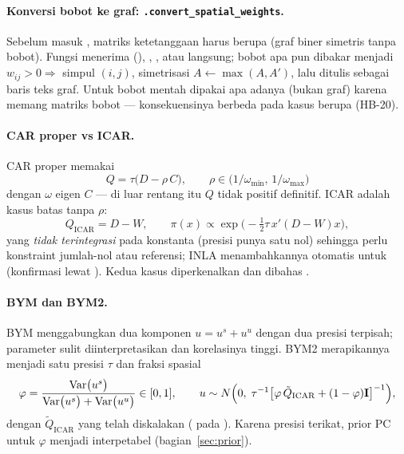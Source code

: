 \paragraph{Konversi bobot ke graf: \texttt{.convert\_spatial\_weights}.}
\label{sec:bayes-w}
Sebelum masuk , matriks ketetanggaan harus berupa
 (graf biner simetris tanpa bobot). Fungsi
 menerima  (),
, , atau  langsung; bobot apa pun
dibakar menjadi $w_{ij}>0\Rightarrow$ simpul $(i,j)$, simetrisasi
$A\leftarrow\max(A,A')$, lalu ditulis sebagai baris teks graf. Untuk
 bobot mentah dipakai apa adanya (bukan graf) karena
 memang matriks bobot --- konsekuensinya berbeda pada
kasus  berupa  (HB-20).

\paragraph{CAR proper vs ICAR.} CAR proper memakai
\begin{equation}
  Q=\tau\bigl(D-\rho\,C\bigr),\qquad
  \rho\in\bigl(1/\omega_{\min},\,1/\omega_{\max}\bigr)
  \label{eq:car-proper}
\end{equation}
dengan $\omega$ eigen $C$ --- di luar rentang itu $Q$ tidak positif
definitif. ICAR adalah kasus batas tanpa $\rho$:
\begin{equation}
  Q_{\text{ICAR}}=D-W,\qquad
  \pi(x)\propto\exp\bigl(-\tfrac12\tau\,x'(D-W)x\bigr),
  \label{eq:icar}
\end{equation}
yang \emph{tidak terintegrasi} pada konstanta (presisi punya satu nol) sehingga
perlu konstraint jumlah-nol atau referensi; INLA menambahkannya otomatis
untuk  (konfirmasi lewat ).
Kedua kasus diperkenalkan \citet{besag1974spatial} dan dibahas
\citet{banerjee2014hierarchical}.

\paragraph{BYM dan BYM2.}\label{sec:bym2} BYM \citep{besag1991bayesian} menggabungkan dua
komponen $u=u^{s}+u^{u}$ dengan dua presisi terpisah; parameter sulit
diinterpretasikan dan korelasinya tinggi. BYM2 \citep{riebler2016intuitive}
merapikannya menjadi satu presisi $\tau$ dan fraksi spasial
\begin{equation}
  \varphi=\frac{\operatorname{Var}\bigl(u^{s}\bigr)}
  {\operatorname{Var}\bigl(u^{s}\bigr)+\operatorname{Var}\bigl(u^{u}\bigr)}\in[0,1],
  \qquad
  u\sim N\Bigl(0,\;\tau^{-1}\bigl[\varphi\,\tilde Q_{\text{ICAR}}
  +(1-\varphi)\mathbf{I}\bigr]^{-1}\Bigr),
  \label{eq:bym2}
\end{equation}
dengan $\tilde Q_{\text{ICAR}}$ yang telah diskalakan
\citep{sorbye2014scaling} ( pada
). Karena presisi terikat, prior PC untuk $\varphi$ menjadi
interpetabel (bagian~\ref{sec:prior}).

